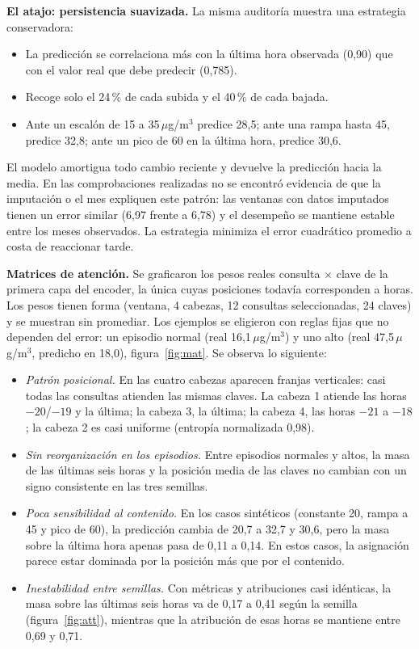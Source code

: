 \documentclass[11pt,letterpaper]{article}
\newcommand{\ugm}{\,$\mu$g/m$^3$}
\begin{document}
\textbf{El atajo: persistencia suavizada.} La misma auditoría muestra una estrategia conservadora:
\begin{itemize}
\item La predicción se correlaciona más con la última hora observada (0,90) que con el valor real que debe
  predecir (0,785).
\item Recoge solo el 24\,\% de cada subida y el 40\,\% de cada bajada.
\item Ante un escalón de 15 a 35\ugm{} predice 28,5; ante una rampa hasta 45, predice 32,8; ante un pico de
  60 en la última hora, predice 30,6.
\end{itemize}
El modelo amortigua todo cambio reciente y devuelve la predicción hacia la media. En las comprobaciones
realizadas no se encontró evidencia de que la imputación o el mes expliquen este patrón: las ventanas con
datos imputados tienen un error similar (6,97 frente a 6,78) y el desempeño se mantiene estable entre los
meses observados. La estrategia minimiza el error cuadrático promedio a costa de reaccionar tarde.

\textbf{Matrices de atención.} Se graficaron los pesos reales consulta $\times$ clave de la primera capa del
encoder, la única cuyas posiciones todavía corresponden a horas. Los pesos tienen forma (ventana, 4 cabezas,
12 consultas seleccionadas, 24 claves) y se muestran sin promediar. Los ejemplos se eligieron con reglas
fijas que no dependen del error: un episodio normal (real 16,1\ugm) y uno alto (real 47,5\ugm, predicho
en 18,0), figura~\ref{fig:mat}. Se observa lo siguiente:
\begin{itemize}
\item \emph{Patrón posicional.} En las cuatro cabezas aparecen franjas verticales: casi todas las consultas
  atienden las mismas claves. La cabeza 1 atiende las horas $-20$/$-19$ y la última; la cabeza 3, la última;
  la cabeza 4, las horas $-21$ a $-18$; la cabeza 2 es casi uniforme (entropía normalizada 0,98).
\item \emph{Sin reorganización en los episodios.} Entre episodios normales y altos, la masa de las últimas
  seis horas y la posición media de las claves no cambian con un signo consistente en las tres semillas.
\item \emph{Poca sensibilidad al contenido.} En los casos sintéticos (constante 20, rampa a 45 y pico de 60),
  la predicción cambia de 20,7 a 32,7 y 30,6, pero la masa sobre la última hora apenas pasa de 0,11 a 0,14.
  En estos casos, la asignación parece estar dominada por la posición más que por el contenido.
\item \emph{Inestabilidad entre semillas.} Con métricas y atribuciones casi idénticas, la masa sobre las
  últimas seis horas va de 0,17 a 0,41 según la semilla (figura~\ref{fig:att}), mientras que la atribución
  de esas horas se mantiene entre 0,69 y 0,71.
\end{itemize}
\end{document}
